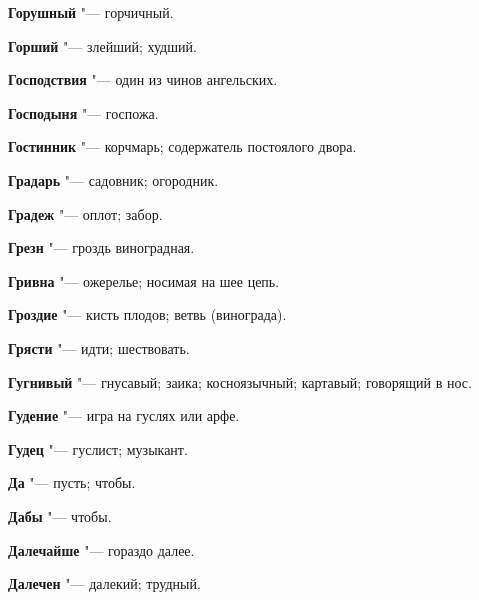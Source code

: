 \begin{mymulticols}{2}
\noindent\textbf{Горушный} "--- горчичный. 




\noindent\textbf{Горший} "--- злейший; худший. 




\noindent\textbf{Господствия} "--- один из чинов ангельских. 




\noindent\textbf{Господыня} "--- госпожа. 




\noindent\textbf{Гостинник} "--- корчмарь; содержатель постоялого двора. 




\noindent\textbf{Градарь} "--- садовник; огородник. 




\noindent\textbf{Градеж} "--- оплот; забор. 




\noindent\textbf{Грезн} "--- гроздь виноградная. 




\noindent\textbf{Гривна} "--- ожерелье; носимая на шее цепь. 




\noindent\textbf{Гроздие} "--- кисть плодов; ветвь (винограда). 




\noindent\textbf{Грясти} "--- идти; шествовать. 




\noindent\textbf{Гугнивый} "--- гнусавый; заика; косноязычный; картавый; говорящий в нос. 




\noindent\textbf{Гудение} "--- игра на гуслях или арфе. 




\noindent\textbf{Гудец} "--- гуслист; музыкант. 




\bukvaending






\noindent\textbf{Да} "--- пусть; чтобы. 




\noindent\textbf{Дабы} "--- чтобы. 




\noindent\textbf{Далечайше} "--- гораздо далее. 




\noindent\textbf{Далечен} "--- далекий; трудный. 





\end{mymulticols}
